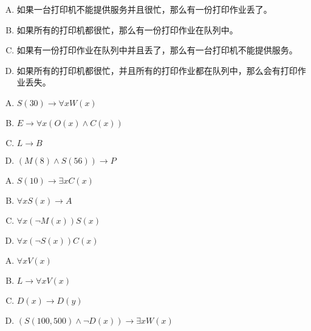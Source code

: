 {{        %
        \begin{practices}
            \begin{enumerate}[A.]
                \item 如果一台打印机不能提供服务并且很忙，那么有一份打印作业丢了。
                \item 如果所有的打印机都很忙，那么有一份打印作业在队列中。
                \item 如果有一份打印作业在队列中并且丢了，那么有一台打印机不能提供服务。
                \item 如果所有的打印机都很忙，并且所有的打印作业都在队列中，那么会有打印作业丢失。
            \end{enumerate}
        \end{practices}

        \begin{practices}
            \begin{enumerate}[A.]
                \item $S(30) \rightarrow \forall x W(x)$
                \item $E \rightarrow \forall x (O(x) \wedge C(x))$
                \item $L \rightarrow B$
                \item $(M(8) \wedge S(56)) \rightarrow P$
            \end{enumerate}
        \end{practices}

        \begin{practices}
            \begin{enumerate}[A.]
                \item $S(10) \rightarrow \exists x C(x)$
                \item $\forall x S(x) \rightarrow A$
                \item $\forall x(\neg M(x)) S(x)$
                \item $\forall x(\neg S(x)) C(x)$
            \end{enumerate}
        \end{practices}

        \begin{practices}
            \begin{enumerate}[A.]
                \item $\forall x V(x)$
                \item $L \rightarrow \forall x V(x)$
                \item $D(x) \rightarrow D(y)$
                \item $(S(100, 500) \wedge \neg D(x)) \rightarrow \exists x W(x)$
            \end{enumerate}
        \end{practices}

}}
